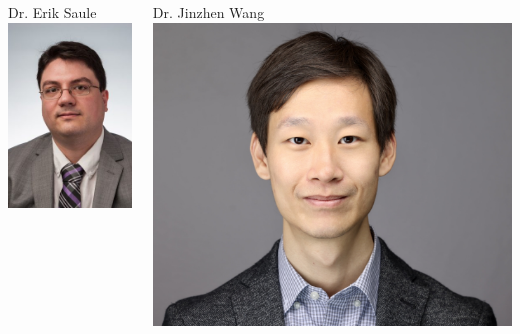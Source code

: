 \documentclass[aspectratio=169]{beamer}
\begin{document}
\begin{frame}
\begin{columns}
    Dr. Erik Saule
    \includegraphics[width=.9\linewidth]{pics/Saule.jpg}
    
    Dr. Jinzhen Wang
    \includegraphics[trim={12cm 0em 16cm 0em}, clip, width=.9\linewidth]{pics/Jinzhen.jpg}


\end{columns}
\end{frame}
\end{document}
